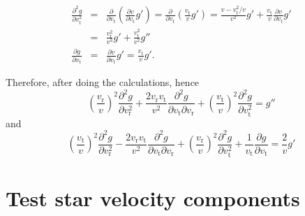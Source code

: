 \documentclass[11pt]{article}
\newcommand{\rt}{\mathrm{t}}
\newcommand{\rr}{\mathrm{r}}
\newcommand{\vr}{v_{\rr}}
\newcommand{\vt}{v_{\rt}}
\begin{document}
\begin{appendices}
\begin{equation}
\begin{array}{ccl}
\displaystyle{\frac{\partial^{2}g}{\partial \vt^{2}}}&=&\displaystyle{\displaystyle{\frac{\partial}{\partial \vt}(\frac{\partial v}{\partial \vt}g')}=\displaystyle{\frac{\partial}{\partial \vt}(\frac{\vt}{v}g')}=\displaystyle{\frac{v-\vt^{2}/v}{v^{2}}g'+\frac{\vt}{v}\frac{\partial v}{\partial \vt}g'}}\\
{}  &=&\displaystyle{\displaystyle{\frac{\vr^{2}}{v^{3}}g'+\frac{\vt^{2}}{v^{2}}g''}}\\
 \displaystyle{\frac{\partial g}{\partial \vt}}&=&\displaystyle{\frac{\partial v}{\partial \vt}g'=\frac{\vt}{v}g'} .           
  \end{array}
  \label{eq:AniToIso_d2}
\end{equation}

Therefore, after doing the calculations, 
hence
\begin{equation}
  \left(\frac{\vr}{v}\right)^{2}\frac{\partial^{2}g}{\partial \vr^{2}}+\frac{2\vr\vt}{v^{2}}\frac{\partial^{2}g}{\partial \vt\partial\vr}+\left(\frac{\vt}{v}\right)^{2}\frac{\partial^{2}g}{\partial \vt^{2}} =g''
  \label{eq:Iso_g''}
\end{equation}
and
\begin{equation}
  \left(\frac{\vt}{v}\right)^{2}\frac{\partial^{2}g}{\partial \vr^{2}}-\frac{2\vr\vt}{v^{2}}\frac{\partial^{2}g}{\partial\vt\partial \vr}+\left(\frac{\vr}{v}\right)^{2}\frac{\partial^{2}g}{\partial \vt^{2}}+\frac{1}{\vt}\frac{\partial g}{\partial \vt} =\frac{2}{v}g'
  \label{eq:Iso_g'}
\end{equation}

\section{Test star velocity components}
\label{app:Test_star_velocity}



\end{appendices}
\end{document}
